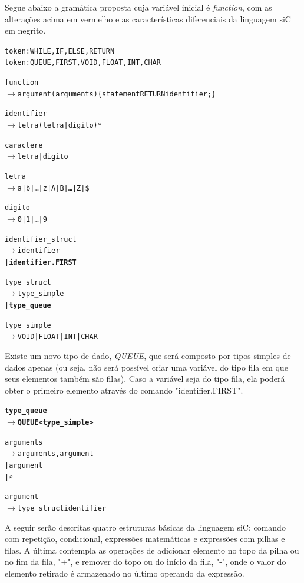 \documentclass[12pt]{article}
\begin{document}
Segue abaixo a gramática proposta cuja variável inicial é \textit{function}, com as alterações acima em vermelho e as características diferenciais da linguagem siC em negrito.
\begin{alltt}{\footnotesize

token: WHILE, IF, ELSE, RETURN 
token: QUEUE, FIRST, VOID, {\color{red}FLOAT}, INT, CHAR

function
   \(\to\) {\color{red}argument} ( arguments ) \{ statement RETURN identifier ; \}
    
identifier
   \(\to\) letra(letra | digito)*
   
{\color{red}caractere
   \(\to\) letra | digito}
    
letra
   \(\to\) a | b | \dots | z | A | B | \dots | Z | \$
   
digito
   \(\to\) 0 | 1 | \dots | 9
	
identifier\_struct
   \(\to\) identifier
    | \textbf{identifier . FIRST}	
	
type\_struct
   \(\to\) type\_simple
    | \textbf{type\_queue}
    
type\_simple
   \(\to\) VOID | {\color{red}FLOAT} | INT | CHAR
   
}\end{alltt}
\indent Existe um novo tipo de dado, \textit{QUEUE}, que será composto por tipos simples de dados apenas (ou seja, não será possível criar uma variável do tipo fila em que seus elementos também são filas). Caso a variável seja do tipo fila, ela poderá obter o primeiro elemento através do comando "identifier.FIRST".
\begin{alltt}{\footnotesize      

\textbf{type\_queue
   \(\to\) QUEUE < type\_simple >}

{\color{red}arguments
   \(\to\) arguments , argument
   | argument
   | \(\varepsilon\)}

argument
   \(\to\) type\_struct identifier
   
}\end{alltt}
\indent A seguir serão descritas quatro estruturas básicas da linguagem siC: comando com repetição, condicional, expressões matemáticas e expressões com pilhas e filas. A última contempla as operações de adicionar elemento no topo da pilha ou no fim da fila, "+", e remover do topo ou do início da fila, "-", onde o valor do elemento retirado é armazenado no último operando da expressão.
\end{document}
